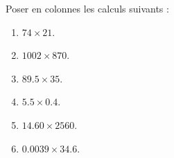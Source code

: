 \begin{exercice*}
   Poser en colonnes les calculs suivants :
   \begin{multicols}{2}
      \begin{enumerate}
         \item $74\times21$.
         \item $\num{1 002}\times870$.
         \item $\num{89.5}\times35$.
         \item $\num{5.5}\times\num{0.4}$.
         \item $\num{14.60}\times\num{2 560}$.
         \item $\num{0.0039}\times\num{34.6}$.
      \end{enumerate}
   \end{multicols}
\end{exercice*}
